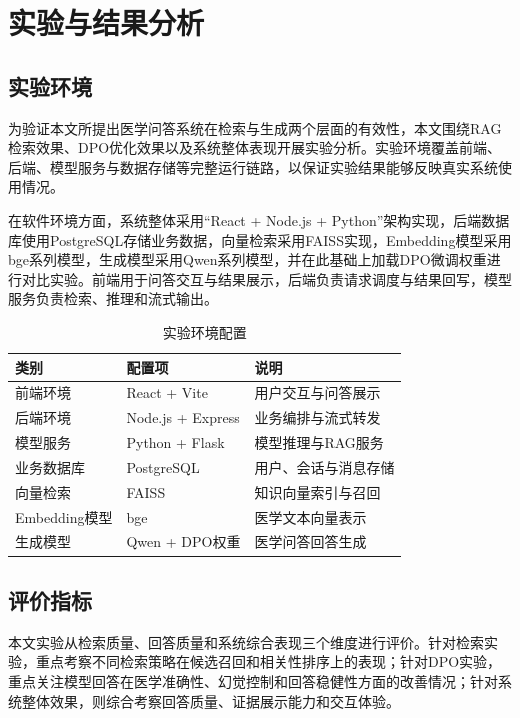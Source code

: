 \chapter{实验与结果分析}

\section{实验环境}

为验证本文所提出医学问答系统在检索与生成两个层面的有效性，本文围绕RAG检索效果、DPO优化效果以及系统整体表现开展实验分析。实验环境覆盖前端、后端、模型服务与数据存储等完整运行链路，以保证实验结果能够反映真实系统使用情况。

在软件环境方面，系统整体采用“React + Node.js + Python”架构实现，后端数据库使用PostgreSQL存储业务数据，向量检索采用FAISS实现，Embedding模型采用bge系列模型，生成模型采用Qwen系列模型，并在此基础上加载DPO微调权重进行对比实验。前端用于问答交互与结果展示，后端负责请求调度与结果回写，模型服务负责检索、推理和流式输出。

\begin{table}[htbp]
    \caption[实验环境配置]{实验环境配置}
    \centering
    \begin{tabular}{lll}
        \toprule
        类别 & 配置项 & 说明 \\
        \midrule
        前端环境 & React + Vite & 用户交互与问答展示 \\
        后端环境 & Node.js + Express & 业务编排与流式转发 \\
        模型服务 & Python + Flask & 模型推理与RAG服务 \\
        业务数据库 & PostgreSQL & 用户、会话与消息存储 \\
        向量检索 & FAISS & 知识向量索引与召回 \\
        Embedding模型 & bge & 医学文本向量表示 \\
        生成模型 & Qwen + DPO权重 & 医学问答回答生成 \\
        \bottomrule
    \end{tabular}
    \label{tab:exp-env}
\end{table}

\section{评价指标}

本文实验从检索质量、回答质量和系统综合表现三个维度进行评价。针对检索实验，重点考察不同检索策略在候选召回和相关性排序上的表现；针对DPO实验，重点关注模型回答在医学准确性、幻觉控制和回答稳健性方面的改善情况；针对系统整体效果，则综合考察回答质量、证据展示能力和交互体验。

